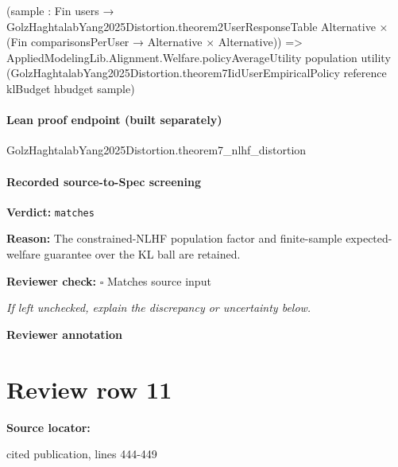 \documentclass[10pt]{article}
\newcommand{\reviewerbox}{%
  \par\noindent\fbox{\parbox{0.96\linewidth}{\rule{0pt}{0.38in}}}\par
}
\newcommand{\reviewmatch}[1]{%
  \par\noindent\textbf{Reviewer check:} $\square$\; #1\par
  \noindent\emph{If left unchecked, explain the discrepancy or uncertainty below.}\par
}
\begin{document}
\begin{ReviewVerbatim}
                                                    (sample :
                                                      Fin users →
                                                        GolzHaghtalabYang2025Distortion.theorem2UserResponseTable
                                                            Alternative ×
                                                          (Fin comparisonsPerUser → Alternative × Alternative)) =>
                                                  AppliedModelingLib.Alignment.Welfare.policyAverageUtility population
                                                    utility
                                                    (GolzHaghtalabYang2025Distortion.theorem7IidUserEmpiricalPolicy
                                                      reference klBudget hbudget sample)
\end{ReviewVerbatim}

\paragraph{Lean proof endpoint (built separately)}\begin{ReviewVerbatim}
GolzHaghtalabYang2025Distortion.theorem7_nlhf_distortion
\end{ReviewVerbatim}

\paragraph{Recorded source-to-Spec screening}
\textbf{Verdict:} \texttt{matches}
\\
{\raggedright
\textbf{Reason:} The constrained-\allowbreak{}NLHF population factor and finite-\allowbreak{}sample expected-\allowbreak{}welfare guarantee over the KL ball are retained.\allowbreak{}
\par}
\reviewmatch{Matches source input}
\noindent\textbf{Reviewer annotation}\par
\reviewerbox
\clearpage
\hypertarget{source-claim-067d55f193fc0110}{}
\section*{Review row 11}
\textbf{Source locator:} {\footnotesize\raggedright cited publication, lines 444-\allowbreak{}449\par}
\end{document}
